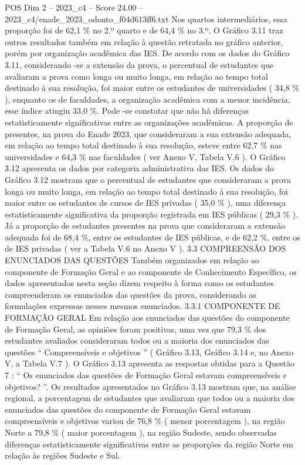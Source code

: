 \begin{textsample}{POS Dim 2 – 2023\_c4 – Score 24.00 – 2023\_c4/enade\_2023\_odonto\_f04d613ff6.txt}
Nos quartos intermediários, essa proporção foi de 62,1 \% no 2.º quarto e de 64,4 \% no 3.º.
O Gráfico 3.11 traz outros resultados também em relação à questão retratada no gráfico anterior, porém por organização acadêmica das IES.
De acordo com os dados do Gráfico 3.11, considerando -se a extensão da prova, o percentual de estudantes que avaliaram a prova como longa ou muito longa, em relação ao tempo total destinado à sua resolução, foi maior entre os estudantes de universidades ( 34,8 \% ), enquanto os de faculdades, a organização acadêmica com a menor incidência, esse índice atingiu 33,0 \%.
Pode -se constatar que não há diferenças estatisticamente significativas entre as organizações acadêmicas.
A proporção de presentes, na prova do Enade 2023, que consideraram a sua extensão adequada, em relação ao tempo total destinado à sua resolução, esteve entre 62,7 \% nas universidades e 64,3 \% nas faculdades ( ver Anexo V, Tabela V.6 ).
O Gráfico 3.12 apresenta os dados por categoria administrativa das IES.
Os dados do Gráfico 3.12 mostram que o percentual de estudantes que consideraram a prova longa ou muito longa, em relação ao tempo total destinado à sua resolução, foi maior entre os estudantes de cursos de IES privadas ( 35,0 \% ), uma diferença estatisticamente significativa da proporção registrada em IES públicas ( 29,3 \% ).
Já a proporção de estudantes presentes na prova que consideraram a extensão adequada foi de 68,4 \%, entre os estudantes de IES públicas, e de 62,2 \%, entre os de IES privadas ( ver a Tabela V.6 no Anexo V ). 3.3 COMPREENSÃO DOS ENUNCIADOS DAS QUESTÕES Também organizados em relação ao componente de Formação Geral e ao componente de Conhecimento Específico, os dados apresentados nesta seção dizem respeito à forma como os estudantes compreenderam os enunciados das questões da prova, considerando as formulações expressas nesses mesmos enunciados. 3.3.1 COMPONENTE DE FORMAÇÃO GERAL Em relação aos enunciados das questões do componente de Formação Geral, as opiniões foram positivas, uma vez que 79,3 \% dos estudantes avaliados consideraram todos ou a maioria dos enunciados das questões “ Compreensíveis e objetivos ” ( Gráfico 3.13, Gráfico 3.14 e, no Anexo V, a Tabela V.7 ).
O Gráfico 3.13 apresenta as respostas obtidas para a Questão 7 : “ Os enunciados das questões de Formação Geral estavam compreensíveis e objetivos? ”.
Os resultados apresentados no Gráfico 3.13 mostram que, na análise regional, a porcentagem de estudantes que avaliaram que todos ou a maioria dos enunciados das questões do componente de Formação Geral estavam compreensíveis e objetivos variou de 76,8 \% ( menor porcentagem ), na região Norte a 79,8 \% ( maior porcentagem ), na região Sudeste, sendo observadas diferenças estatisticamente significativas entre as proporções da região Norte em relação às regiões Sudeste e Sul.

\end{textsample}
